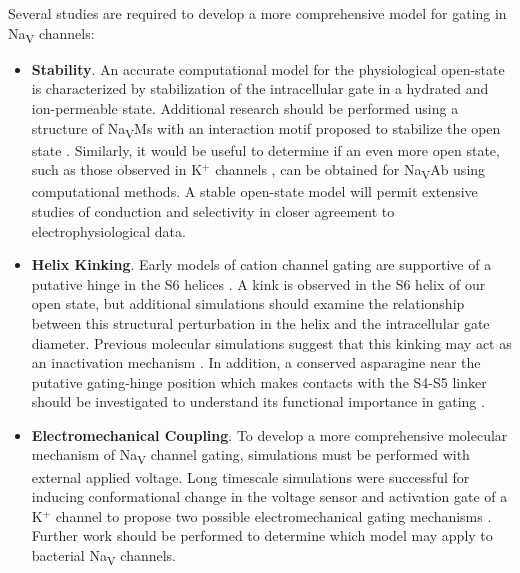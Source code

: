 \begin{refsection}
Several studies are required to develop a more comprehensive model for gating in Na\textsubscript{V} channels:
\begin{itemize}
\item \textbf{Stability}. An accurate computational model for the physiological open-state is characterized by stabilization of the intracellular gate in a hydrated and ion-permeable state. Additional research should be performed using a structure of Na\textsubscript{V}Ms with an interaction motif proposed to stabilize the open state \cite{Sula:2017jx}. Similarly, it would be useful to determine if an even more open state, such as those observed in K$^+$ channels \cite{Cuello:2010gi}, can be obtained for Na\textsubscript{V}Ab using computational methods. A stable open-state model will permit extensive studies of conduction and selectivity in closer agreement to electrophysiological data.
\item \textbf{Helix Kinking}. Early models of cation channel gating are supportive of a putative hinge in the S6 helices \cite{Jiang:2002fx,Zhao:2004vo,Shafrir:2008ic}. A kink is observed in the S6 helix of our open state, but additional simulations should examine the relationship between this structural perturbation in the helix and the intracellular gate diameter. Previous molecular simulations suggest that this kinking may act as an inactivation mechanism \cite{Boiteux:2014ut}. In addition, a conserved asparagine near the putative gating-hinge position which makes contacts with the S4-S5 linker should be investigated to understand its functional importance in gating \cite{OReilly:2017ur}.
\item \textbf{Electromechanical Coupling}. To develop a more comprehensive molecular mechanism of Na\textsubscript{V} channel gating, simulations must be performed with external applied voltage. Long timescale simulations were successful for inducing conformational change in the voltage sensor and activation gate of a K$^+$ channel to propose two possible electromechanical gating mechanisms \cite{Jensen:2012ee,FernandezMarino:2018vw}. Further work should be performed to determine which model may apply to bacterial Na\textsubscript{V} channels.
\end{itemize}



\end{refsection}
